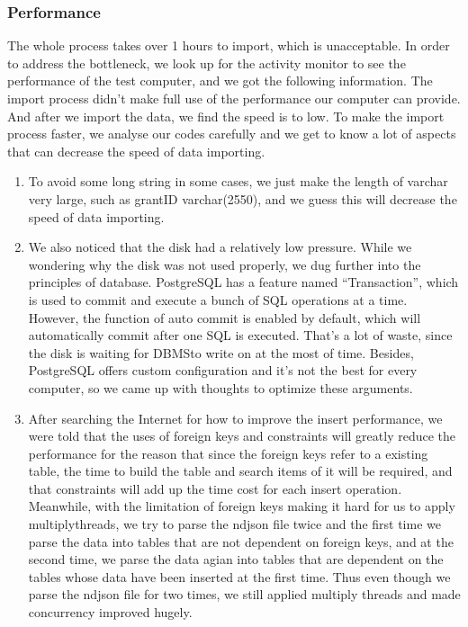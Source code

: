 \documentclass{article}
\begin{document}
\subsubsection{Performance}
The whole process takes over 1 hours to import, which is unacceptable. In order to address the bottleneck, we look up for the activity monitor to see the performance of the test computer, and we got the following information.
The import process didn’t make full use of the performance our computer can provide.
And after we import the data, we find the speed is to low. To make the import process faster, we analyse our codes carefully and we get to know a lot of aspects that can decrease the speed of data importing.\\
\begin{enumerate}
\item To avoid some long string in some cases, we just make the length of varchar very large, such as grantID varchar(2550), and we guess this will decrease the speed of data importing.
\item We also noticed that the disk had a relatively low pressure. While we wondering why the disk was not used properly, we dug further into the principles of database. PostgreSQL has a feature named “Transaction”, which is used to commit and execute a bunch of SQL operations at a time. However, the
 function of auto commit is enabled by default, which will automatically commit after one SQL is executed. That’s a lot of waste, since the disk is waiting for DBMSto write on at the most of time. Besides, PostgreSQL offers custom configuration and it’s not the best for every computer, so we came up with thoughts to optimize these arguments.
\item After searching the Internet for how to improve the insert performance, we were told that the
 uses of foreign keys and constraints will greatly reduce the performance for the reason that since the foreign keys refer to a existing table, the time to build the table and search items of it will be required, and that constraints will add up the time cost for each insert operation. Meanwhile, with the limitation of foreign keys making it hard for us to apply multiplythreads, we try to parse the ndjson file twice and the first time we parse the data into tables that are not dependent on foreign keys, and at the second time, we parse the data agian into tables that are dependent on the tables whose data have been inserted at the first time. Thus even though we parse the ndjson file for two times, we still applied multiply threads and made concurrency improved hugely.
\end{enumerate}
\end{document}

